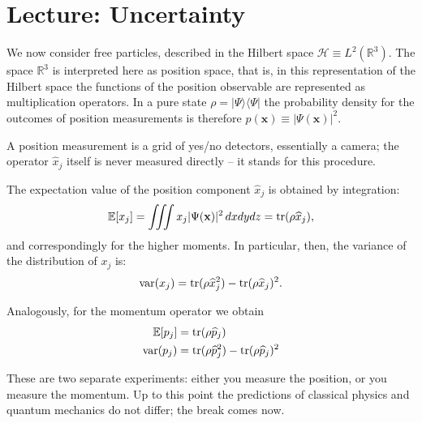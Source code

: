 \section{Lecture: Uncertainty}
We now consider free particles, described in the Hilbert space $\mathcal{H}\equiv L^2(\mathbb{R}^3)$. The space $\mathbb{R}^3$ is interpreted here as position space, that is, in this representation of the Hilbert space the functions of the position observable are represented as multiplication operators. In a pure state $\rho = |\Psi\rangle\langle \Psi|$ the probability density for the outcomes of position measurements is therefore $p(\mathbf{x})\equiv |\Psi(\mathbf{x})|^2$.

A position measurement is a grid of yes/no detectors, essentially a camera; the operator $\widehat{x}_j$ itself is never measured directly -- it stands for this procedure.

The expectation value of the position component $\widehat{x}_j$ is obtained by integration:
\begin{equation}
	\mathbb{E}[x_j] = \iiint x_j |\Psi(\mathbf{x})|^2\, dxdydz = \operatorname{tr}(\rho \widehat{x}_j),
\end{equation}
and correspondingly for the higher moments. In particular, then, the variance of the distribution of $x_j$ is:
\begin{equation}
	\text{var}(x_j) = \operatorname{tr}(\rho \widehat{x}_j^2) - \operatorname{tr}(\rho \widehat{x}_j)^2.
\end{equation}

Analogously, for the momentum operator we obtain
\begin{align}
	\mathbb{E}[p_j] &= \operatorname{tr}(\rho \widehat{p}_j) \\
	\text{var}(p_j) &= \operatorname{tr}(\rho \widehat{p}_j^2) - \operatorname{tr}(\rho \widehat{p}_j)^2
\end{align}

These are two separate experiments: either you measure the position, or you measure the momentum. Up to this point the predictions of classical physics and quantum mechanics do not differ; the break comes now.

